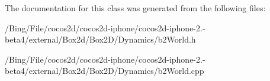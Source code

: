 The documentation for this class was generated from the following files\-:\begin{DoxyCompactItemize}
\item 
/\-Bing/\-File/cocos2d/cocos2d-\/iphone/cocos2d-\/iphone-\/2.-\/beta4/external/\-Box2d/\-Box2\-D/\-Dynamics/b2\-World.\-h\item 
/\-Bing/\-File/cocos2d/cocos2d-\/iphone/cocos2d-\/iphone-\/2.-\/beta4/external/\-Box2d/\-Box2\-D/\-Dynamics/b2\-World.\-cpp\end{DoxyCompactItemize}
